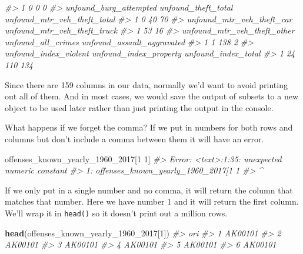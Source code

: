 \documentclass[
  12pt,
]{book}
\newenvironment{Shaded}{\begin{snugshade}}{\end{snugshade}}
\newcommand{\CommentTok}[1]{\textcolor[rgb]{0.37,0.37,0.37}{\textit{#1}}}
\newcommand{\DecValTok}[1]{\textcolor[rgb]{0.06,0.06,0.06}{#1}}
\newcommand{\KeywordTok}[1]{\textcolor[rgb]{0.27,0.27,0.27}{\textbf{#1}}}
\newcommand{\NormalTok}[1]{#1}
\begin{document}
\begin{Shaded}
\begin{Highlighting}[]
\CommentTok{\#\textgreater{} 1                  0                        0                           0}
\CommentTok{\#\textgreater{}   unfound\_burg\_attempted unfound\_theft\_total unfound\_mtr\_veh\_theft\_total}
\CommentTok{\#\textgreater{} 1                      0                  40                          70}
\CommentTok{\#\textgreater{}   unfound\_mtr\_veh\_theft\_car unfound\_mtr\_veh\_theft\_truck}
\CommentTok{\#\textgreater{} 1                        53                          16}
\CommentTok{\#\textgreater{}   unfound\_mtr\_veh\_theft\_other unfound\_all\_crimes unfound\_assault\_aggravated}
\CommentTok{\#\textgreater{} 1                           1                138                          2}
\CommentTok{\#\textgreater{}   unfound\_index\_violent unfound\_index\_property unfound\_index\_total}
\CommentTok{\#\textgreater{} 1                    24                    110                 134}
\end{Highlighting}
\end{Shaded}

Since there are 159 columns in our data, normally we'd want to avoid printing out all of them. And in most cases, we would save the output of subsets to a new object to be used later rather than just printing the output in the console.

What happens if we forget the comma? If we put in numbers for both rows and columns but don't include a comma between them it will have an error.

\begin{Shaded}
\begin{Highlighting}[]
\NormalTok{offenses\_known\_yearly\_}\DecValTok{1960}\NormalTok{\_}\DecValTok{2017}\NormalTok{[}\DecValTok{1} \DecValTok{1}\NormalTok{]}
\CommentTok{\#\textgreater{} Error: \textless{}text\textgreater{}:1:35: unexpected numeric constant}
\CommentTok{\#\textgreater{} 1: offenses\_known\_yearly\_1960\_2017[1 1}
\CommentTok{\#\textgreater{}                                       \^{}}
\end{Highlighting}
\end{Shaded}

If we only put in a single number and no comma, it will return the column that matches that number. Here we have number 1 and it will return the first column. We'll wrap it in \texttt{head()} so it doesn't print out a million rows.

\begin{Shaded}
\begin{Highlighting}[]
\KeywordTok{head}\NormalTok{(offenses\_known\_yearly\_}\DecValTok{1960}\NormalTok{\_}\DecValTok{2017}\NormalTok{[}\DecValTok{1}\NormalTok{])}
\CommentTok{\#\textgreater{}       ori}
\CommentTok{\#\textgreater{} 1 AK00101}
\CommentTok{\#\textgreater{} 2 AK00101}
\CommentTok{\#\textgreater{} 3 AK00101}
\CommentTok{\#\textgreater{} 4 AK00101}
\CommentTok{\#\textgreater{} 5 AK00101}
\CommentTok{\#\textgreater{} 6 AK00101}
\end{Highlighting}
\end{Shaded}
\end{document}
